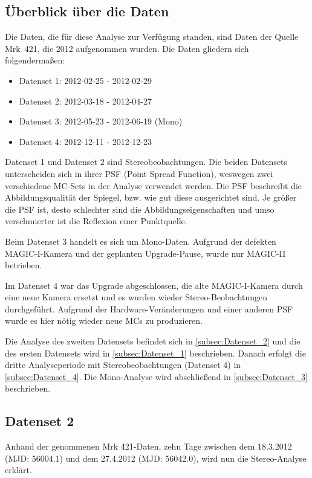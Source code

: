 \subsection{Überblick über die Daten}
Die Daten, die für diese Analyse zur Verfügung standen, sind Daten der Quelle Mrk~421, die 2012 aufgenommen wurden.
Die Daten gliedern sich folgendermaßen:

\begin{itemize}
 \item Datenset 1: 2012-02-25 - 2012-02-29
 \item Datenset 2: 2012-03-18 - 2012-04-27
 \item Datenset 3: 2012-05-23 - 2012-06-19 (Mono)
 \item Datenset 4: 2012-12-11 - 2012-12-23
\end{itemize}

Datenset 1 und Datenset 2 sind Stereobeobachtungen.
Die beiden Datensets unterscheiden sich in ihrer PSF (Point Spread Function), weswegen zwei verschiedene MC-Sets in der Analyse verwendet werden.
Die PSF beschreibt die Abbildungsqualität der Spiegel, bzw. wie gut diese ausgerichtet sind.
Je größer die PSF ist, desto schlechter sind die Abbildungseigenschaften und umso verschmierter ist die Reflexion einer Punktquelle.

Beim Datenset 3 handelt es sich um Mono-Daten. 
Aufgrund der defekten MAGIC-I-Kamera und der geplanten Upgrade-Pause, wurde nur MAGIC-II betrieben.

Im Datenset 4 war das Upgrade abgeschlossen, die alte MAGIC-I-Kamera durch eine neue Kamera ersetzt und es wurden wieder Stereo-Beobachtungen durchgeführt.
Aufgrund der Hardware-Veränderungen und einer anderen PSF wurde es hier nötig wieder neue MCs zu produzieren.

Die Analyse des zweiten Datensets befindet sich in \autoref{subsec:Datenset_2} und die des ersten Datensets wird in \autoref{subsec:Datenset_1} beschrieben.
Danach erfolgt die dritte Analyseperiode mit Stereobeobachtungen (Datenset 4) in \autoref{subsec:Datenset_4}.
Die Mono-Analyse wird abschließend in \autoref{subsec:Datenset_3} beschrieben.


\subsection{Datenset 2}
\label{subsec:Datenset_2}
Anhand der genommenen Mrk 421-Daten, zehn Tage zwischen dem 18.3.2012 (MJD: 56004.1) und dem 27.4.2012 (MJD: 56042.0), wird nun die Stereo-Analyse erklärt.

